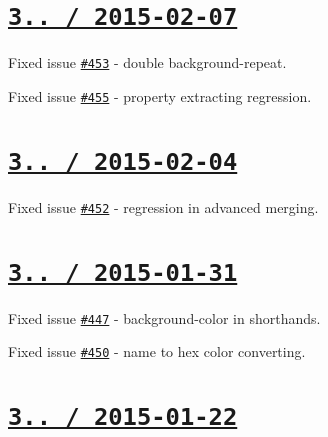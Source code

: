 \section*{\href{https://github.com/jakubpawlowicz/clean-css/compare/v3.0.9...v3.0.10}{\tt 3.. / 2015-\/02-\/07} }


\begin{DoxyItemize}
\item Fixed issue \href{https://github.com/jakubpawlowicz/clean-css/issues/453}{\tt \#453} -\/ double {\ttfamily background-\/repeat}.
\item Fixed issue \href{https://github.com/jakubpawlowicz/clean-css/issues/455}{\tt \#455} -\/ property extracting regression.
\end{DoxyItemize}

\section*{\href{https://github.com/jakubpawlowicz/clean-css/compare/v3.0.8...v3.0.9}{\tt 3.. / 2015-\/02-\/04} }


\begin{DoxyItemize}
\item Fixed issue \href{https://github.com/jakubpawlowicz/clean-css/issues/452}{\tt \#452} -\/ regression in advanced merging.
\end{DoxyItemize}

\section*{\href{https://github.com/jakubpawlowicz/clean-css/compare/v3.0.7...v3.0.8}{\tt 3.. / 2015-\/01-\/31} }


\begin{DoxyItemize}
\item Fixed issue \href{https://github.com/jakubpawlowicz/clean-css/issues/447}{\tt \#447} -\/ {\ttfamily background-\/color} in shorthands.
\item Fixed issue \href{https://github.com/jakubpawlowicz/clean-css/issues/450}{\tt \#450} -\/ name to hex color converting.
\end{DoxyItemize}

\section*{\href{https://github.com/jakubpawlowicz/clean-css/compare/v3.0.6...v3.0.7}{\tt 3.. / 2015-\/01-\/22} }


